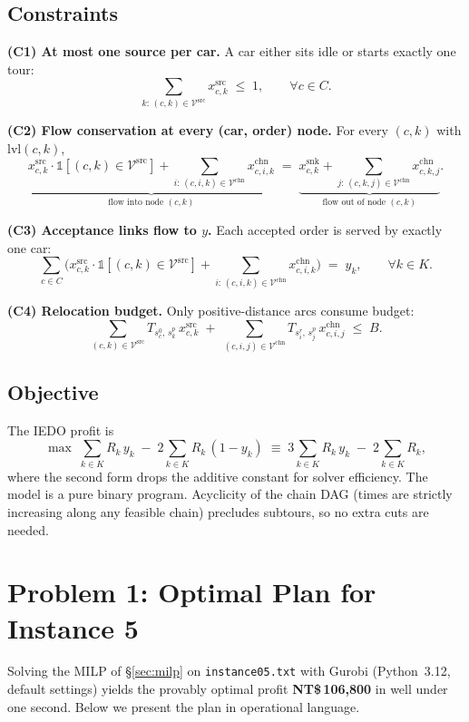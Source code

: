 \documentclass[a4paper, 12pt]{article}
\begin{document}
\subsection{Constraints}

\textbf{(C1) At most one source per car.} A car either sits idle or starts exactly one tour:
\[
\sum_{k:\,(c,k)\in\mathcal{V}^{\text{src}}} x^{\text{src}}_{c,k} \;\le\; 1, \qquad \forall c\in C.
\]

\textbf{(C2) Flow conservation at every (car, order) node.} For every $(c,k)$ with $\mathrm{lvl}(c,k)$,
\[
\underbrace{x^{\text{src}}_{c,k} \cdot \mathbb{1}[(c,k)\in\mathcal{V}^{\text{src}}] + \sum_{i:\,(c,i,k)\in\mathcal{V}^{\text{chn}}} x^{\text{chn}}_{c,i,k}}_{\text{flow into node }(c,k)}
\;=\;
\underbrace{x^{\text{snk}}_{c,k} + \sum_{j:\,(c,k,j)\in\mathcal{V}^{\text{chn}}} x^{\text{chn}}_{c,k,j}}_{\text{flow out of node }(c,k)}.
\]

\textbf{(C3) Acceptance links flow to $y$.} Each accepted order is served by exactly one car:
\[
\sum_{c\in C}\Biggl(x^{\text{src}}_{c,k}\cdot \mathbb{1}[(c,k)\in\mathcal{V}^{\text{src}}] + \sum_{i:\,(c,i,k)\in\mathcal{V}^{\text{chn}}} x^{\text{chn}}_{c,i,k}\Biggr) \;=\; y_k, \qquad \forall k\in K.
\]

\textbf{(C4) Relocation budget.} Only positive-distance arcs consume budget:
\[
\sum_{(c,k)\in\mathcal{V}^{\text{src}}} T_{s^0_c,\,s^p_k}\, x^{\text{src}}_{c,k} \;+\; \sum_{(c,i,j)\in\mathcal{V}^{\text{chn}}} T_{s^r_i,\,s^p_j}\, x^{\text{chn}}_{c,i,j} \;\le\; B.
\]

\subsection{Objective}

The IEDO profit is
\[
\max\; \sum_{k\in K} R_k\, y_k \;-\; 2\sum_{k\in K} R_k\,(1-y_k) \;\equiv\; 3\sum_{k\in K} R_k\, y_k \;-\; 2\sum_{k\in K} R_k,
\]
where the second form drops the additive constant for solver efficiency. The model is a pure binary program. Acyclicity of the chain DAG (times are strictly increasing along any feasible chain) precludes subtours, so no extra cuts are needed.


\section{Problem 1: Optimal Plan for Instance 5}\label{sec:instance5}

Solving the MILP of \S\ref{sec:milp} on \texttt{instance05.txt} with Gurobi (Python~3.12, default settings) yields the provably optimal profit \textbf{NT\$\,106{,}800} in well under one second. Below we present the plan in operational language.
\end{document}
